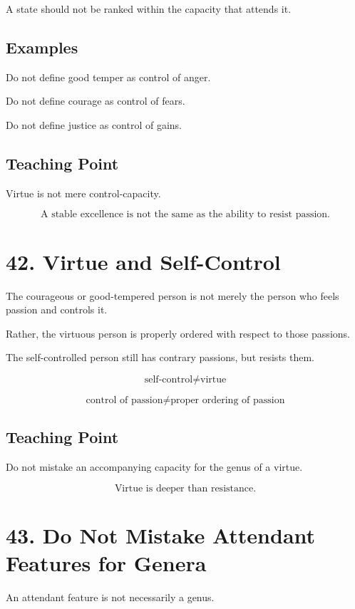 \documentclass[12pt]{article}
\begin{document}
A state should not be ranked within the capacity that attends it.

\subsection*{Examples}

Do not define good temper as control of anger.

Do not define courage as control of fears.

Do not define justice as control of gains.

\subsection*{Teaching Point}

Virtue is not mere control-capacity.

\[
\boxed{
\text{A stable excellence is not the same as the ability to resist passion.}
}
\]

\section*{42. Virtue and Self-Control}

The courageous or good-tempered person is not merely the person who feels
passion and controls it.

Rather, the virtuous person is properly ordered with respect to those passions.

The self-controlled person still has contrary passions, but resists them.

\[
\text{self-control} \neq \text{virtue}
\]

\[
\text{control of passion} \neq \text{proper ordering of passion}
\]

\subsection*{Teaching Point}

Do not mistake an accompanying capacity for the genus of a virtue.

\[
\boxed{
\text{Virtue is deeper than resistance.}
}
\]

\section*{43. Do Not Mistake Attendant Features for Genera}

An attendant feature is not necessarily a genus.
\end{document}

